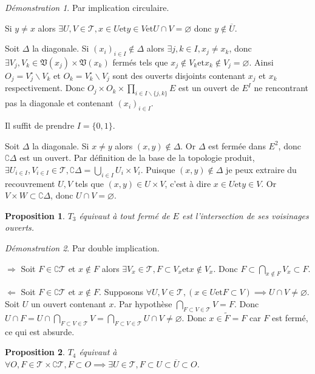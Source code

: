 \documentclass[a4paper, 11pt, french]{book}
\newenvironment{itemise}{\itemize}{\enditemize}
\theoremstyle{plain} %
\newtheorem{proposition}{Proposition}
\theoremstyle{definition} %
\theoremstyle{remark} %
\newtheorem*{demonstration}{Démonstration}
\renewcommand{\setminus}{\backslash}
\newcommand{\1}{\mathds{1}}
\newcommand\vide{\varnothing}
\newcommand{\et}{\mathrel{\mathrm{et}}}
\renewcommand{\frak}[1]{\mathfrak{#1}}
\newcommand{\scr}[1]{\mathscr{#1}}
\newcommand\equivalence[3]{
	\begin{demonstration}
		#1
		\begin{itemise}
			\item[$\Longrightarrow$] #2
			\item[$\Longleftarrow$] #3
		\end{itemise}
	\end{demonstration}
}
\begin{document}
\begin{demonstration}
	Par implication circulaire.
	\begin{itemise}
		\item Si $y\neq x$ alors $\exists U, V\in\scr{T}, x\in U\et y\in V\et U\cap V=\vide$ donc $y\notin\overline{U}$.
		\item Soit $\Delta$ la diagonale.
		Si $(x_i)_{i\in I}\notin\Delta$ alors $\exists j, k\in I, x_j\neq x_k$, donc $\exists V_j, V_k\in\frak{V}(x_j)\times\frak{V}(x_k)$ fermés tels que $x_j\notin V_k\et x_k\notin V_j=\vide$.
		Ainsi $O_j=V_j^\circ\setminus V_k$ et $O_k=V_k^\circ\setminus V_j$ sont des ouverts disjoints contenant $x_j$ et $x_k$ respectivement.
		Donc $O_j\times O_k\times\prod_{i\in I\setminus\{j, k\}}E$ est un ouvert de $E^I$ ne rencontrant pas la diagonale et contenant $(x_i)_{i\in I}$.
		\item Il suffit de prendre $I=\{0, 1\}$.
		\item Soit $\Delta$ la diagonale.
		Si $x\neq y$ alors $(x, y)\notin\Delta$.
		Or $\Delta$ est fermée dans $E^2$, donc $\complement\Delta$ est un ouvert.
		Par définition de la base de la topologie produit, $\exists U_{i\in I}, V_{i\in I}\in\scr{T}, \complement\Delta=\bigcup_{i\in I} U_i\times V_i$.
		Puisque $(x, y)\notin\Delta$ je peux extraire du recouvrement $U, V$ tels que $(x, y)\in U\times V$, c'est à dire $x\in U\et y\in V$.
		Or $V\times W\subset\complement\Delta$, donc $U\cap V=\vide$.
	\end{itemise}
\end{demonstration}

\begin{proposition}
	$T_3$ équivaut à tout fermé de $E$ est l'intersection de ses voisinages ouverts.
\end{proposition}

\equivalence{Par double implication.}{
	Soit $F\in\complement\scr{T}$ et $x\notin F$ alors $\exists V_x\in\scr{T}, F\subset V_x\et x\notin V_x$.
		Donc $F\subset\bigcap_{x\notin F}V_x\subset F$.
}{
	Soit $F\in\complement\scr{T}$ et $x\notin F$.
		Supposons $\forall U, V\in\scr{T}, (x\in U\et F\subset V)\implies U\cap V\neq\vide$.
		Soit $U$ un ouvert contenant $x$.
		Par hypothèse $\bigcap_{F\subset V\in\scr{T}}V=F$.
		Donc $U\cap F=U\cap\bigcap_{F\subset V\in\scr{T}}V=\bigcap_{F\subset V\in\scr{T}}U\cap V\neq\vide$.
		Donc $x\in\widetilde{F}=F$ car $F$ est fermé, ce qui est absurde.
}

\begin{proposition}
	$T_4$ équivaut à $\forall O, F\in\scr{T}\times\complement\scr{T}, F\subset O\implies\exists U\in\scr{T}, F\subset U\subset\overline{U}\subset O$.
\end{proposition}
\end{document}
